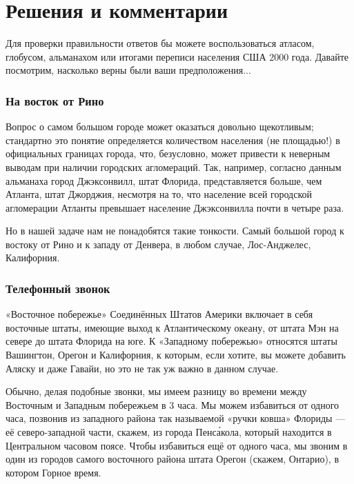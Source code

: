 \section*{Решения и комментарии}


Для проверки правильности ответов бы можете воспользоваться атласом, глобусом, альманахом или итогами переписи населения США 2000 года. 
Давайте посмотрим, насколько верны были ваши предположения...


\subsubsection*{На восток от Рино}%


Вопрос о самом большом городе может оказаться довольно щекотливым; 
стандартно это понятие определяется количеством населения (не площадью!) в официальных границах города, что, безусловно, может привести к неверным выводам
при наличии городских агломераций.
Так, например, согласно данным альманаха город Джэксонвилл, штат Флорида, представляется больше, чем Атланта, штат Джорджия, несмотря на то, что население всей городской агломерации Атланты превышает население Джэксонвилла почти в четыре раза.

\medskip

Но в нашей задаче нам не понадобятся такие тонкости. Самый большой город к востоку от Рино и к западу от Денвера, в любом случае, Лос-Анджелес, Калифорния.                                 \heart






\subsubsection*{Телефонный звонок}%


«Восточное побережье» Соединённых Штатов Америки включает в себя восточные штаты, имеющие выход к Атлантическому океану, от штата Мэн на севере до штата Флорида на юге. 
К «Западному побережью» относятся штаты Вашингтон, Орегон и Калифорния,
к которым, если хотите, вы можете добавить Аляску и даже Гавайи, но это не так уж важно в данном случае. %


Обычно, делая подобные звонки, мы имеем разницу во времени между Восточным и Западным побережьем в 3 часа. Мы можем избавиться от одного часа, позвонив из западного района так называемой «ручки ковша» Флориды --- её северо-западной части, %
скажем, из города Пенс\'{а}кола, который находится в Центральном часовом поясе. 
Чтобы избавиться ещё от одного часа, мы звоним в один из городов самого восточного района штата Орегон (скажем, Онтарио), в котором Горное время. 

